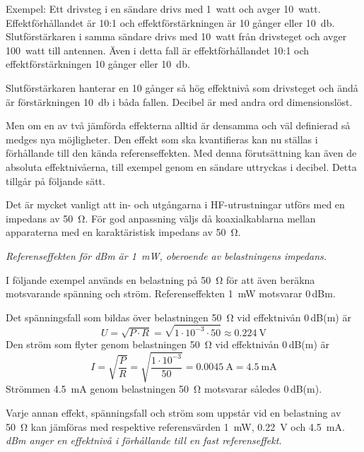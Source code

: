 Exempel: Ett drivsteg i en sändare drivs med 1~watt och avger 10~watt.
Effektförhållandet är 10:1 och effektförstärkningen är 10 gånger eller
\qty{10}{\decibel}.
Slutförstärkaren i samma sändare drivs med 10~watt från drivsteget och avger
100~watt till antennen.
Även i detta fall är effektförhållandet 10:1 och effektförstärkningen 10 gånger
eller \qty{10}{\decibel}.

Slutförstärkaren hanterar en 10 gånger så hög effektnivå som drivsteget och ändå
är förstärkningen \qty{10}{\decibel} i båda fallen.
Decibel är med andra ord dimensionslöst.

Men om en av två jämförda effekterna alltid är densamma och väl definierad så
medges nya möjligheter.
Den effekt som ska kvantifieras kan nu ställas i förhållande till den kända
referenseffekten.
Med denna förutsättning kan även de absoluta effektnivåerna, till exempel genom
en sändare uttryckas i decibel.
Detta tillgår på följande sätt.

Det är mycket vanligt att in- och utgångarna i HF-utrustningar utförs
med en impedans av \qty{50}{\ohm}.
För god anpassning väljs då koaxialkablarna mellan apparaterna med en
karaktäristisk impedans av \qty{50}{\ohm}.

\emph{Referenseffekten för dBm är \qty{1}{\milli\watt}, oberoende av
  belastningens impedans.}

I följande exempel används en belastning på \qty{50}{\ohm} för att även
beräkna motsvarande spänning och ström.
Referenseffekten \qty{1}{\milli\watt} motsvarar 0\,dBm.

Det spänningsfall som bildas över belastningen \qty{50}{\ohm} vid effektnivån
0\,dB(m) är
\[U = \sqrt{P\cdot R} = \sqrt{1\cdot 10^{-3} \cdot 50} \approx \qty{0.224}{\volt}\]
Den ström som flyter genom belastningen \qty{50}{\ohm} vid effektnivån 0\,dB(m)
är
\[
I = \sqrt{\frac{P}{R}} = \sqrt{\frac{1\cdot 10^{-3}}{50}} = \qty{0.0045}{\ampere} = \qty{4.5}{\milli\ampere}
\]
Strömmen \qty{4,5}{\milli\ampere} genom belastningen \qty{50}{\ohm} motsvarar
således 0\,dB(m).

Varje annan effekt, spänningsfall och ström som uppstår vid en belastning av
\qty{50}{\ohm} kan jämföras med respektive referensvärden \qty{1}{\milli\watt},
\qty{0,22}{\volt} och \qty{4,5}{\milli\ampere}.
\emph{dBm anger en effektnivå i förhållande till en fast referenseffekt.}

